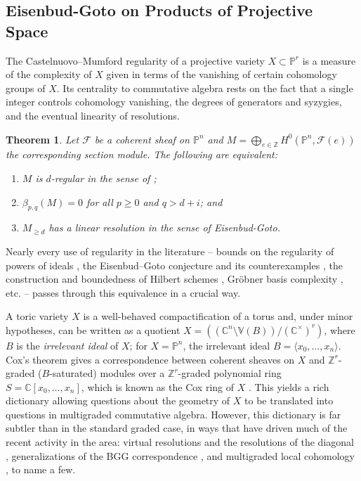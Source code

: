 \documentclass[11pt,reqno]{amsart}
\newtheorem{theorem}[lemma]{Theorem}
\theoremstyle{remark}
\newcommand{\CC}{\mathbb{C}}
\newcommand{\PP}{\mathbb{P}}
\newcommand{\VV}{\mathbb{V}}
\newcommand{\ZZ}{\mathbb{Z}}
\newcommand{\cF}{\mathcal{F}}
\begin{document}
\subsection{Eisenbud-Goto on Products of Projective Space}\label{subsec:prior:homological-algebra-on-toric}

The Castelnuovo--Mumford regularity of a projective variety $X\subset \PP^{r}$ is a measure of the complexity of $X$ given in terms of the vanishing of certain cohomology groups of $X$. Its centrality to commutative algebra rests on the fact that a single integer controls cohomology vanishing, the degrees of generators and syzygies, and the eventual linearity of resolutions. 

\begin{theorem}\cite{eisenbudGoto84}\label{thm:eisenbud-goto}
Let $\cF$ be a coherent sheaf on $\PP^{n}$ and $M=\bigoplus_{e\in\ZZ} H^0(\PP^{n},\cF(e))$ the corresponding section module. The following are equivalent: 
\begin{enumerate}
\item $M$ is $d$-regular in the sense of \cite{mumford65};
\item $\beta_{p,q}(M)=0$ for all $p\geq0$ and $q>d+i$; and
\item $M_{\geq d}$ has a linear resolution in the sense of Eisenbud-Goto.
\end{enumerate}
\end{theorem}

Nearly every use of regularity in the literature -- bounds on the regularity of powers of ideals \cite{CHT99,Kodiyalam00}, the Eisenbud--Goto conjecture and its counterexamples \cite{MP18}, the construction and boundedness of Hilbert schemes \cite{grothendieck61,gotzmann78}, Gr\"obner basis complexity \cite{bayerStillman87}, etc. -- passes through this equivalence in a crucial way.

A toric variety $X$ is a well-behaved compactification of a torus and, under minor hypotheses, can be written as a quotient $X=((\CC^{n}\setminus \VV(B))/(\CC^{\times})^r)$, where $B$ is the \emph{irrelevant ideal} of $X$; for $X = \PP^n$, the irrelevant ideal $B=\langle x_0,\ldots,x_n\rangle$. Cox's theorem gives a correspondence between coherent sheaves on $X$ and $\ZZ^r$-graded ($B$-saturated) modules over a $\ZZ^r$-graded polynomial ring $S=\CC[x_0,\ldots,x_n]$, which is known as the Cox ring of $X$ \cite{cox95}. This yields a rich dictionary allowing questions about the geometry of $X$ to be translated into questions in multigraded commutative algebra. However, this dictionary is far subtler than in the standard graded case, in ways that have driven much of the recent activity in the area: virtual resolutions and the resolutions of the diagonal \cite{BES20, HHL24, brownErman24-1, faveroHuang23}, generalizations of the BGG correspondence \cite{EES15,brownErmanTate}, and multigraded local cohomology \cite{botbolChardin17, chardinNemati20}, to name a few. 
\end{document}
